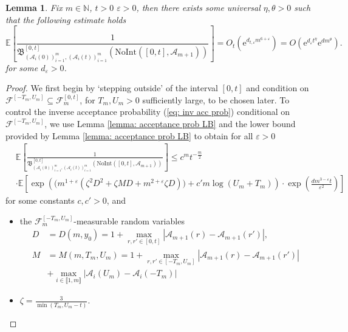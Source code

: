 \documentclass[11pt, reqno]{amsart}
\numberwithin{equation}{section}
\newcounter{dummy} \numberwithin{dummy}{section}
\newtheorem{lemma}[dummy]{Lemma}
\newcommand{\N}{\ensuremath{\mathbb{N}}}
\begin{document}
\begin{lemma}\label{lemma: inv acceptance prob cond}
Fix $m\in \N$, $t > 0$ $\varepsilon > 0$, then there exists some universal $\eta, \theta >0$ such that the following estimate holds
\begin{equation*}
\mathbb{E}\left [\displaystyle\frac{1}{\mathfrak{B}^{[0,t]}_{(\mathcal{A}_i(0))_{i=1}^m, (\mathcal{A}_i(t))_{i=1}^m}(\mathrm{NoInt}([0,t], \mathcal{A}_{m+1}))} \right ] = O_t(\mathrm{e}^{d_{t, \varepsilon}m^{6 + \varepsilon}}) = O(\mathrm{e}^{d_{\varepsilon}t^\eta}\mathrm{e}^{dm^{\theta}}).
\end{equation*}
for some $d_{\varepsilon} > 0$. 
\end{lemma}
\begin{proof}
    
We first begin by `stepping outside' of the interval $[0,t]$ and condition on $\mathscr{F}^{[-T_m,U_m]}\subseteq \mathscr{F}^{[0,t]}_m$, for $T_m, U_m>0 $ sufficiently large, to be chosen later. To control the inverse acceptance probability (\ref{eq: inv acc prob}) conditional on $\mathscr{F}^{[-T_m,U_m]}$, we use Lemma \ref{lemma: acceptance prob LB} and the lower bound provided by Lemma \ref{lemma: acceptance prob LB} to obtain for all $\varepsilon>0$
\begin{align*}
&\mathbb{E}\left [\displaystyle\frac{1}{\mathfrak{B}^{[0,t]}_{(\mathcal{A}_i(0))_{i=1}^m, (\mathcal{A}_i(t))_{i=1}^m}(\mathrm{NoInt}([0,t], \mathcal{A}_{m+1}))} \right ]\le c^m t^{-\frac{m}{2}} \\
&\cdot \mathbb{E}\left [\exp\left(\big(m^{1+\varepsilon}(\zeta^2 D^2 + \zeta MD+ m^{2+\varepsilon} \zeta D)\big) + c'm\log(U_m+T_m)  \right)\cdot \exp \left( \frac{dm^{3-\varepsilon} t}{\varepsilon^2}\right)  \right ]
\end{align*}
for some constants $c, c'> 0$, and
\begin{itemize}
    \item[1.] the $\mathscr{F}^{[-T_m, U_m]}_m$-measurable random variables
	\begin{align*}
	D &= D(m, y_0)= 1 + \max_{r, r' \in [0, t]} |\mathcal{A}_{m+1}(r) - \mathcal{A}_{m+1}(r')|, \\
M &= M(m, T_m, U_m) = 1 + \max_{r, r' \in [-T_m, U_m]} |\mathcal{A}_{m+1}(r) - \mathcal{A}_{m+1}(r')|\\
&+ \max_{i \in \llbracket 1, m\rrbracket } |\mathcal{A}_i(U_m) - \mathcal{A}_i(-T_m)|
	\end{align*}
    \item[2.] $\zeta = \frac{3}{\min(T_m, U_m-t)}$.
\end{itemize}


\end{proof}
\end{document}
